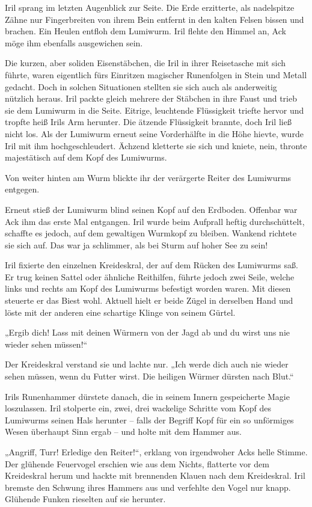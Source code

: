 Iril sprang im letzten Augenblick zur Seite. Die Erde erzitterte, als nadelspitze Zähne nur Fingerbreiten von ihrem Bein entfernt in den kalten Felsen bissen und brachen. Ein Heulen entfloh dem Lumiwurm. Iril flehte den Himmel an, Ack möge ihm ebenfalls ausgewichen sein.

Die kurzen, aber soliden Eisenstäbchen, die Iril in ihrer Reisetasche mit sich führte, waren eigentlich fürs Einritzen magischer Runenfolgen in Stein und Metall gedacht. Doch in solchen Situationen stellten sie sich auch als anderweitig nützlich heraus. Iril packte gleich mehrere der Stäbchen in ihre Faust und trieb sie dem Lumiwurm in die Seite. Eitrige, leuchtende Flüssigkeit triefte hervor und tropfte heiß Irils Arm herunter. Die ätzende Flüssigkeit brannte, doch Iril ließ nicht los. Als der Lumiwurm erneut seine Vorderhälfte in die Höhe hievte, wurde Iril mit ihm hochgeschleudert. Ächzend kletterte sie sich und kniete, nein, thronte majestätisch auf dem Kopf des Lumiwurms.

Von weiter hinten am Wurm blickte ihr der verärgerte Reiter des Lumiwurms entgegen.

Erneut stieß der Lumiwurm blind seinen Kopf auf den Erdboden. Offenbar war Ack ihm das erste Mal entgangen. Iril wurde beim Aufprall heftig durchschüttelt, schaffte es jedoch, auf dem gewaltigen Wurmkopf zu bleiben. Wankend richtete sie sich auf. Das war ja schlimmer, als bei Sturm auf hoher See zu sein!

Iril fixierte den einzelnen Kreideskral, der auf dem Rücken des Lumiwurms saß. Er trug keinen Sattel oder ähnliche Reithilfen, führte jedoch zwei Seile, welche links und rechts am Kopf des Lumiwurms befestigt worden waren. Mit diesen steuerte er das Biest wohl. Aktuell hielt er beide Zügel in derselben Hand und löste mit der anderen eine schartige Klinge von seinem Gürtel.

„Ergib dich! Lass mit deinen Würmern von der Jagd ab und du wirst uns nie wieder sehen müssen!“

Der Kreideskral verstand sie und lachte nur. „Ich werde dich auch nie wieder sehen müssen, wenn du Futter wirst. Die heiligen Würmer dürsten nach Blut.“

Irils Runenhammer dürstete danach, die in seinem Innern gespeicherte Magie loszulassen. Iril stolperte ein, zwei, drei wackelige Schritte vom Kopf des Lumiwurms seinen Hals herunter – falls der Begriff Kopf für ein so unförmiges Wesen überhaupt Sinn ergab – und holte mit dem Hammer aus.

„Angriff, Turr! Erledige den Reiter!“, erklang von irgendwoher Acks helle Stimme. Der glühende Feuervogel erschien wie aus dem Nichts, flatterte vor dem Kreideskral herum und hackte mit brennenden Klauen nach dem Kreideskral. Iril bremste den Schwung ihres Hammers aus und verfehlte den Vogel nur knapp. Glühende Funken rieselten auf sie herunter.

